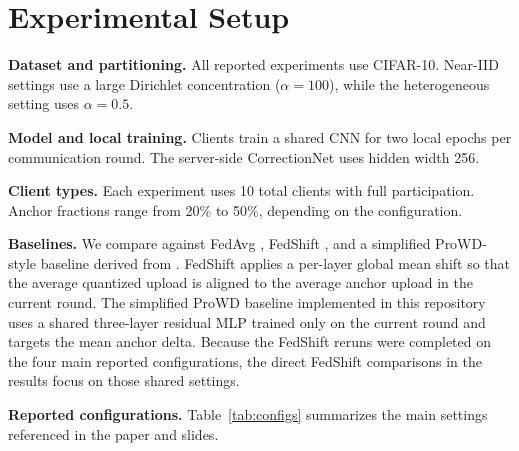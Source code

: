\section{Experimental Setup}

\textbf{Dataset and partitioning.}
All reported experiments use CIFAR-10. Near-IID settings use a large Dirichlet
concentration ($\alpha=100$), while the heterogeneous setting uses
$\alpha=0.5$.

\textbf{Model and local training.}
Clients train a shared CNN for two local epochs per communication round. The
server-side CorrectionNet uses hidden width 256.

\textbf{Client types.}
Each experiment uses 10 total clients with full participation. Anchor fractions
range from 20\% to 50\%, depending on the configuration.

\textbf{Baselines.}
We compare against FedAvg \citep{mcmahan2017}, FedShift
\citep{seo2024fedshift}, and a simplified ProWD-style baseline derived from
\citet{yoon2022prowd}. FedShift applies a per-layer global mean shift so that
the average quantized upload is aligned to the average anchor upload in the
current round. The simplified ProWD baseline implemented in this repository
uses a shared three-layer residual MLP trained only on the current round and
targets the mean anchor delta. Because the FedShift reruns were completed on
the four main reported configurations, the direct FedShift comparisons in the
results focus on those shared settings.

\textbf{Reported configurations.}
Table~\ref{tab:configs} summarizes the main settings referenced in the paper and
slides.

\begin{table}[h]
  \centering
  \caption{Reported experimental configurations.}
  \label{tab:configs}
  \small
\end{table}

